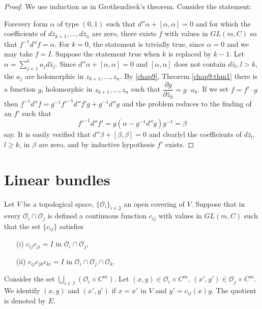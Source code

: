 \begin{proof}
We use induction as in Grothendieck's theorem. Consider the statement:

For\pageoriginale every form $\alpha$ of type $(0,1)$ such that $d''
\alpha + [\alpha, \alpha] =0$ and for which the coefficients of
$d\bar{z}_{k+1}, \ldots, d \bar{z}_n$ are zero, there exists $f$ with
values in $GL(m,C)$ so that $f^{-1} d'' f = \alpha$. For $k=0$, the
statement is trivially true, since $\alpha =0$ and we may take $f =
I$. Suppose the statement true when $k$ is replaced by $k-1$. Let
$\alpha = \sum\limits^k_{j=1} a_j d \bar{z}_j$. Since $d'' \alpha +
[\alpha , \alpha] =0$ and $[\alpha, \alpha]$ does not contain
$d\bar{z}_l, l >k$, the $a_j$ are holomorphic in $z_{k+1}, \ldots,
z_n$. By \ref{chap9}, Theorem \ref{chap9:thm1} there is a function
$g$, holomorphic in 
$z_{k+1}, \ldots, z_n$ such that $\dfrac{\partial g}{\partial
  \bar{z}_k} = g \cdot a_k$. If we set $f = f' \cdot g$ then $f^{-1}
d'' f = g^{-1} f'^{-1} d'' f' g + g^{-1} d'' g $ and the problem
reduces to the finding of an $f'$ such that 
$$
f'^{-1} d'' f' = g (\alpha - g^{-1} d'' g) g^{-1} = \beta
$$
say. It is easily verified that $d'' \beta + [\beta, \beta] = 0$ and
clearlyl the coefficients of $d \bar{z}_l$, $l \geq k$, in $\beta$ are
zero, and by inductive hypothesis $f'$ exists.
\end{proof}

\section{Linear bundles}\label{chap10:sec2}

Let $V$ be a topological space, $\{\mathscr{O}_i\}_{i\in
  \mathfrak{J}}$ an open covering of $V$. Suppose that in every
$\mathscr{O}_i \cap \mathscr{O}_j$ is defined a continuous function
$c_{ij}$ with values in $GL(m,C)$ such that the set $\{c_{ij}\}$
satisfies 
\begin{itemize}
\item[(i)] $c_{ij} c_{ji} = I$ in  $\mathscr{O}_i \cap \mathscr{O}_j$, 

\item[(ii)] $c_{ij} c_{jk} c_{ki} = I$ in $\mathscr{O}_i \cap
  \mathscr{O}_j \cap \mathscr{O}_k$.
\end{itemize}
Consider the set $\bigcup\limits_{i \in \mathscr{I}} (\mathscr{O}_i
\times C^m)$. Let $(x, y) \in \mathscr{O}_i \times C^m$, $(x', y') \in
\mathscr{O}_j \times C^m$. We identify $(x,y)$ and $(x', y')$ if $x =
x'$ in $V$ and $y' = c_{ij} (x) y$. The quotient is denoted by $E$. 

